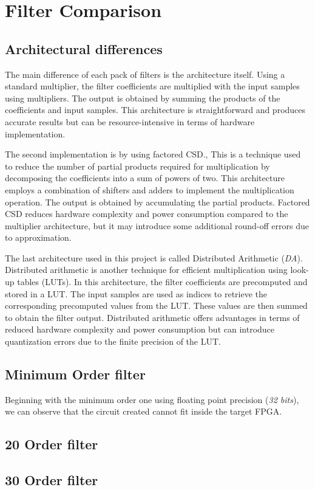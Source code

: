 
\section{Filter Comparison}

\subsection{Architectural differences}
The main difference of each pack of filters is the architecture itself.
Using a standard multiplier, the filter coefficients are multiplied with the input samples using multipliers. The output is obtained by summing the products of the coefficients and input samples. This architecture is straightforward and produces accurate results but can be resource-intensive in terms of hardware implementation.

The second implementation is by using factored CSD., This is a technique used to reduce the number of partial products required for multiplication by decomposing the coefficients into a sum of powers of two. This architecture employs a combination of shifters and adders to implement the multiplication operation. The output is obtained by accumulating the partial products. Factored CSD reduces hardware complexity and power consumption compared to the multiplier architecture, but it may introduce some additional round-off errors due to approximation.

The last architecture used in this project is called Distributed Arithmetic (\emph{DA}).
Distributed arithmetic is another technique for efficient multiplication using look-up tables (LUTs). In this architecture, the filter coefficients are precomputed and stored in a LUT. The input samples are used as indices to retrieve the corresponding precomputed values from the LUT. These values are then summed to obtain the filter output. Distributed arithmetic offers advantages in terms of reduced hardware complexity and power consumption but can introduce quantization errors due to the finite precision of the LUT.

\subsection{Minimum Order filter}
Beginning with the minimum order one using floating point precision (\textit{32 bits}), we can observe that the circuit created cannot fit inside the target FPGA.

\subsection{20 Order filter}

\subsection{30 Order filter}
